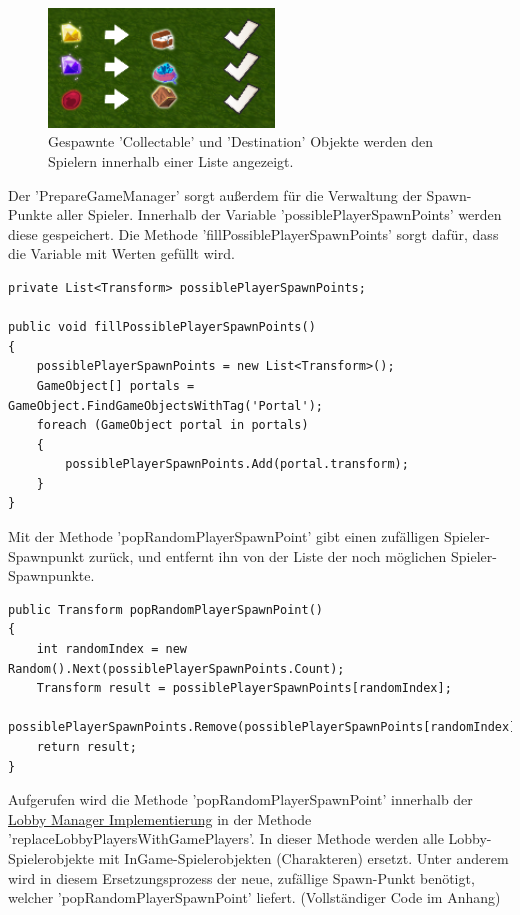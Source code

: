 \begin{figure}[H]
	\centering
	\includegraphics[width=60mm]{images/prototyp_task_list.png}
	\caption[Initial Task List]{Gespawnte 'Collectable' und 'Destination' Objekte werden den Spielern innerhalb einer Liste angezeigt.}
	\label{pic:prototyp_task_list}
\end{figure}

Der 'PrepareGameManager' sorgt außerdem für die Verwaltung der Spawn-Punkte aller Spieler. Innerhalb der Variable 'possiblePlayerSpawnPoints' werden diese gespeichert. Die Methode 'fillPossiblePlayerSpawnPoints' sorgt dafür, dass die Variable mit Werten gefüllt wird.

\begin{lstlisting}[caption= PrepareGameManager.cs fillPossiblePlayerSpawnPoints()]
private List<Transform> possiblePlayerSpawnPoints;

public void fillPossiblePlayerSpawnPoints()
{
	possiblePlayerSpawnPoints = new List<Transform>();
	GameObject[] portals = GameObject.FindGameObjectsWithTag('Portal');
	foreach (GameObject portal in portals)
	{
		possiblePlayerSpawnPoints.Add(portal.transform);
	}
}
\end{lstlisting}

Mit der Methode 'popRandomPlayerSpawnPoint' gibt einen zufälligen Spieler-Spawnpunkt zurück, und entfernt ihn von der Liste der noch möglichen Spieler-Spawnpunkte.

\begin{lstlisting}[caption= PrepareGameManager.cs popRandomPlayerSpawnPoint()]
public Transform popRandomPlayerSpawnPoint()
{
	int randomIndex = new Random().Next(possiblePlayerSpawnPoints.Count);
	Transform result = possiblePlayerSpawnPoints[randomIndex];
	possiblePlayerSpawnPoints.Remove(possiblePlayerSpawnPoints[randomIndex]);
	return result;
}
\end{lstlisting}

Aufgerufen wird die Methode 'popRandomPlayerSpawnPoint' innerhalb der \hyperref[Lobby Manager Implementierung]{Lobby Manager Implementierung} in der Methode 'replaceLobbyPlayersWithGamePlayers'. In dieser Methode werden alle Lobby-Spielerobjekte mit InGame-Spielerobjekten (Charakteren) ersetzt. Unter anderem wird in diesem Ersetzungsprozess der neue, zufällige Spawn-Punkt benötigt, welcher 'popRandomPlayerSpawnPoint' liefert. (Vollständiger Code im Anhang)

